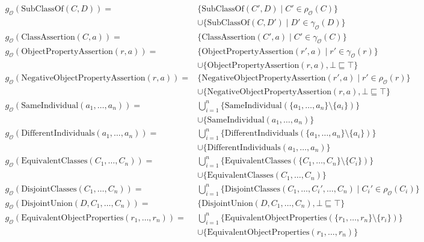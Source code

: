 \begingroup
\scriptsize
\begin{align*}
    g_\mathcal{O}(\mathrm{SubClassOf}(C, D)) =& \{\mathrm{SubClassOf}(C', D) \mid C' \in \rho_\mathcal{O} (C)\} \\& \cup \{\mathrm{SubClassOf}(C, D') \mid D' \in \gamma_\mathcal{O}  (D)\} \\
    g_\mathcal{O}(\mathrm{ClassAssertion}(C, a)) =& \{\mathrm{ClassAssertion}(C', a) \mid C' \in \gamma_\mathcal{O}  (C)\} \\
    g_\mathcal{O}(\mathrm{ObjectPropertyAssertion}(r, a)) =& \{\mathrm{ObjectPropertyAssertion}(r', a) \mid r' \in \gamma_\mathcal{O}  (r)\} \\& \cup \{ \mathrm{ObjectPropertyAssertion}(r, a), \bot \sqsubseteq \top \} \\
    g_\mathcal{O}(\mathrm{NegativeObjectPropertyAssertion}(r, a)) =& \{\mathrm{NegativeObjectPropertyAssertion}(r', a) \mid r' \in \rho_\mathcal{O}  (r)\} \\& \cup \{\mathrm{NegativeObjectPropertyAssertion}(r, a), \bot \sqsubseteq \top \} \\
    g_\mathcal{O}(\mathrm{SameIndividual}(a_1, \dots, a_n)) =& \bigcup_{i=1}^n \{ \mathrm{SameIndividual}(\{a_1, \dots, a_n\} \setminus \{a_i\}) \} \\& \cup \{ \mathrm{SameIndividual}(a_1, \dots, a_n)\} \\
    g_\mathcal{O}(\mathrm{DifferentIndividuals}(a_1, \dots, a_n)) =& \bigcup_{i=1}^n \{ \mathrm{DifferentIndividuals}(\{a_1, \dots, a_n\} \setminus \{a_i\}) \} \\& \cup \{ \mathrm{DifferentIndividuals}(a_1, \dots, a_n)\} \\
    g_\mathcal{O}(\mathrm{EquivalentClasses}(C_1, \dots, C_n)) =& \bigcup_{i=1}^n \{ \mathrm{EquivalentClasses}(\{C_1, \dots, C_n\} \setminus \{C_i\}) \} \\& \cup \{ \mathrm{EquivalentClasses}(C_1, \dots, C_n) \} \\
    g_\mathcal{O}(\mathrm{DisjointClasses}(C_1, \dots, C_n)) =& \bigcup_{i=1}^n \{ \mathrm{DisjointClasses}(C_1, \dots, C_i', \dots, C_n) \mid C_i' \in \rho_\mathcal{O}(C_i) \} \\
    g_\mathcal{O}(\mathrm{DisjointUnion}(D, C_1, \dots, C_n)) =& \{ \mathrm{DisjointUnion}(D, C_1, \dots, C_n), \bot \sqsubseteq \top \} \\
    g_\mathcal{O}(\mathrm{EquivalentObjectProperties}(r_1, \dots, r_n)) =& \bigcup_{i=1}^n \{ \mathrm{EquivalentObjectProperties}(\{r_1, \dots, r_n\} \setminus \{r_i\}) \} \\& \cup \{ \mathrm{EquivalentObjectProperties}(r_1, \dots, r_n) \} \\

\end{align*}
